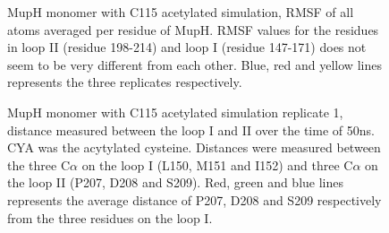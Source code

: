 		\setlength\fboxsep{5pt}
		\setlength\fboxrule{1.5pt}
		\begin{figure}[htbp]
		\centering
		\caption[MupH monomer with C115 acetylated simulation, RMSF of all atoms averaged per residue of MupH.]{MupH monomer with C115 acetylated simulation, RMSF of all atoms averaged per residue of MupH. RMSF values for the residues in loop II (residue 198-214) and loop I (residue 147-171) does not seem to be very different from each other. Blue, red and yellow lines represents the three replicates respectively.}
		\label{fig:muphCyaRmsf}
		\end{figure}			
			
		\setlength\fboxsep{5pt}
		\setlength\fboxrule{1.5pt}
		\begin{figure}[htbp]
		\centering
		\caption[MupH monomer with C115 acetylated simulation replicate 1, distance measured between the loop I and II over the time of 50ns.]{MupH monomer with C115 acetylated simulation replicate 1, distance measured between the loop I and II over the time of 50ns. CYA was the acytylated cysteine. Distances were measured between the three C$ \alpha $ on the loop I (L150, M151 and I152) and three C$ \alpha $ on the loop II (P207, D208 and S209). Red, green and blue lines represents the average distance of P207, D208 and S209 respectively from the three residues on the loop I.}
		\label{fig:muphcyaSim0}
		\end{figure}

